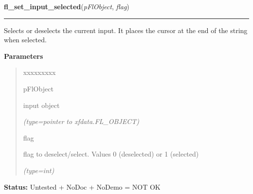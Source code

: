 \hspace{.8\funcindent}\begin{boxedminipage}{\funcwidth}

    \raggedright \textbf{fl\_set\_input\_selected}(\textit{pFlObject}, \textit{flag})

    \vspace{-1.5ex}

    \rule{\textwidth}{0.5\fboxrule}
\setlength{\parskip}{2ex}
    Selects or deselects the current input. It places the cursor at the end
    of the string when selected.

\setlength{\parskip}{1ex}
      \textbf{Parameters}
      \vspace{-1ex}

      \begin{quote}
        \begin{Ventry}{xxxxxxxxx}

          \item[pFlObject]

          input object

            {\it (type=pointer to xfdata.FL\_OBJECT)}

          \item[flag]

          flag to deselect/select. Values 0 (deselected) or 1 (selected)

            {\it (type=int)}

        \end{Ventry}

      \end{quote}

\textbf{Status:} Untested + NoDoc + NoDemo = NOT OK



    \end{boxedminipage}

    \label{xformslib:flinput:fl_set_input_selected_range}

    \vspace{0.5ex}

